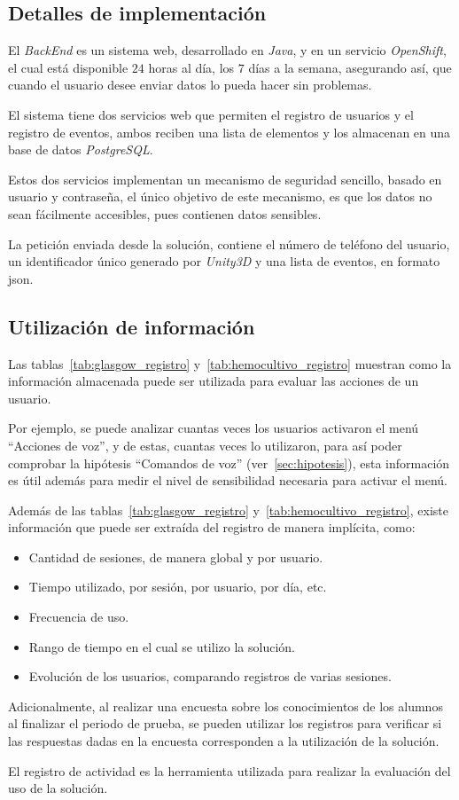 \subsection{Detalles de implementación}

El \textit{BackEnd} es un sistema web, desarrollado en \textit{Java}, y
 en un servicio \textit{OpenShift}, el cual está
disponible $24$ horas al día, los $7$ días a la semana, asegurando así, que
cuando el usuario desee enviar datos lo pueda hacer sin problemas.

El sistema tiene dos servicios web que permiten el registro de usuarios y el
registro de eventos, ambos reciben una lista de elementos y los almacenan en una
base de datos \textit{PostgreSQL}.

Estos dos servicios implementan un mecanismo de seguridad sencillo, basado en usuario y
contraseña, el único objetivo de este mecanismo, es que los datos no sean
fácilmente accesibles, pues contienen datos sensibles.

La petición enviada desde la solución, contiene el número de teléfono del
usuario, un identificador único generado por \textit{Unity3D} y una lista de
eventos, en formato \Gls{json}.

\subsection{Utilización de información}

Las tablas~\ref{tab:glasgow_registro} y~\ref{tab:hemocultivo_registro} muestran
como la información almacenada puede ser utilizada para evaluar las acciones de
un usuario.

Por ejemplo, se puede analizar cuantas veces los usuarios activaron el menú
\enquote{Acciones de voz}, y de estas, cuantas veces lo utilizaron, para así
poder comprobar la hipótesis \enquote{Comandos de voz}
(ver~\ref{sec:hipotesis}), esta información es útil además para medir el
nivel de sensibilidad necesaria para activar el menú.

Además de las tablas~\ref{tab:glasgow_registro}
y~\ref{tab:hemocultivo_registro}, existe información que puede ser extraída del
registro de manera implícita, como:

\begin{itemize}
\item Cantidad de sesiones, de manera global y por usuario.
\item Tiempo utilizado, por sesión, por usuario, por día, etc.
\item Frecuencia de uso.
\item Rango de tiempo en el cual se utilizo la solución.
\item Evolución de los usuarios, comparando registros de varias sesiones.
\end{itemize}

Adicionalmente, al realizar una encuesta sobre los conocimientos de los alumnos
al finalizar el periodo de prueba, se pueden utilizar los registros para
verificar si las respuestas dadas en la encuesta corresponden a la utilización
de la solución.

El registro de actividad es la herramienta utilizada para realizar la evaluación
del uso de la solución.
